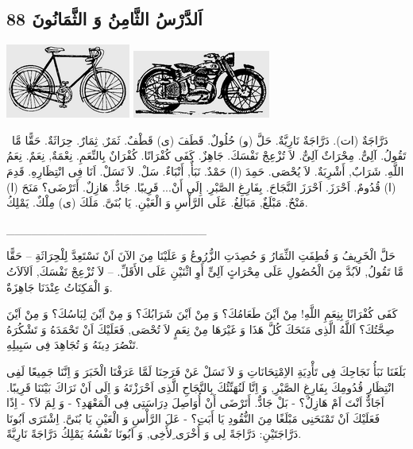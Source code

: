 \documentclass[a5paper]{article}
\begin{document}
\subsection[اَلدَّرْسُ الثَّامِنُ وَ الثَّمَانُونَ 88]{اَلدَّرْسُ الثَّامِنُ وَ الثَّمَانُونَ 88}
 \includegraphics[width=1.6146in,height=0.9583in]{MuhammadBagauddinlatinized-img249.png}   \includegraphics[width=1.7811in,height=0.8752in]{MuhammadBagauddinlatinized-img250.png} 

\ دَرَّاجَةٌ (ات). دَرَّاجَةٌ نَارِيَّةٌ. حَلَّ (و) حُلُولٌ. قَطَفَ (ى) قَطْفٌ. ثَمَرٌ, ثِمَارٌ. حِرَاثَةٌ. حَقًّا مَّا تَقُولُ. آلِىٌّ. مِحْرَاثٌ آلِىٌّ. لاَ تُزْعِجْ نَفْسَكَ. جَاهِزٌ. كَفَى كُفْرَانًا. كُفْرَانٌ بِالنِّعَمِ. نِعْمَةٌ, نِعَمٌ. نِعَمُ اللَّهِ. شَرَابٌ, أَشْرِبَةٌ. لاَ يُحْصَى. حَمِدَ (ا) حَمْدٌ. نَبَأٌ, أَنْبَاءٌ. سَلْ. لاَ تَسَلْ. اَنَا فِى انْتِظَارِهِ. قَدِمَ (ا) قُدُومٌ. اَحْرَزَ. اَحْرَزَ النَّجَاحَ. بِفَارِغِ الصَّبْرِ. إِلَى أَنْ... قَرِيبًا. جَادٌّ. هَازِلٌ. أَتَرْضَى؟ مَنَحَ (ا) مَنْحٌ. مَبْلَغٌ, مَبَالِغُ. عَلَى الرَّأْسِ وَ الْعَيْنِ. يَا بُنَىَّ. مَلَكَ (ى) مِلْكٌ. يَمْلِكُ.

\_\_\_\_\_\_\_\_\_\_\_\_\_\_\_\_\_\_\_\_\_\_\_\_

حَلَّ الْخَرِيفُ وَ قُطِفَتِ الثِّمَارُ وَ حُصِدَتِ الزُّرُوعُ وَ عَلَيْنَا مِنَ الآنَ اَنْ نَسْتَعِدَّ لِلْحِرَاثَةِ – حَقًّا مَّا تَقُولُ, لاَبُدَّ مِنَ الْحُصُولِ عَلَى مِحْرَاثٍ آلِىٍّ أَوِ اثْنَيْنِ عَلَى الأَقَلِّ. – لاَ تُزْعِجْ نَفْسَكَ, اَلآلاَتُ وَ الْمَكِنَاتُ عِنْدَنَا جَاهِزَةٌ.

كَفَى كُفْرَانًا بِنِعَمِ اللَّهِ! مِنْ اَيْنَ طَعَامُكَ؟ وَ مِنْ اَيْنَ شَرَابُكَ؟ وَ مِنْ اَيْنَ لِبَاسُكَ؟ وَ مِنْ اَيْنَ صِحَّتُكَ؟ اَللَّهُ الَّذِى مَنَحَكَ كُلَّ هَذَا وَ غَيْرَهَا مِنْ نِعَمٍ لاَ تُحْصَى, فَعَلَيْكَ اَنْ تَحْمَدَهُ وَ تَشْكُرَهُ تَنْصُرَ دِينَهُ وَ تُجَاهِدَ فِى سَبِيلِهِ.

بَلَغَنَا نَبَأُ نَجَاحِكَ فِى تَأْدِيَةِ الاِمْتِحَانَاتِ وَ لاَ تَسَلْ عَنْ فَرَحِنَا لَمَّا عَرَفْنَا الْخَبَرَ وَ اِنَّنَا جَمِيعًا لَفِى انْتِظَارِ قُدُومِكَ بِفَارِغِ الصَّبْرِ, وَ اِنَّا لَنُهَنِّئُكَ بِالنَّجَاحِ الَّذِى اَحْرَزْتَهُ وَ اِلَى اَنْ نَرَاكَ بَيْنَنَا قَرِيبًا. اَجَادٌّ اَنْتَ اَمْ هَازِلٌ؟ - بَلْ جَادٌّ. أَتَرْضَى أَنْ أُوَاصِلَ دِرَاسَتِى فِى الْمَعْهَدِ؟ - وَ لِمَ لاَ؟ - اِذًا فَعَلَيْكَ اَنْ تَمْنَحَنِى مَبْلَغًا مِنَ النُّقُودِ يَا أَبَتِ؟ - عَلَ الرَّأْسِ وَ الْعَيْنِ يَا بُنَىَّ. اِشْتَرَى اَبُونَا دَرَّاجَتَيْنِ: دَرَّاجَةً لِى وَ أُخْرَى ِلأَخِى, وَ اَبُونَا نَفْسُهُ يَمْلِكُ دَرَّاجَةً نَارِيَّةً.
\end{document}
